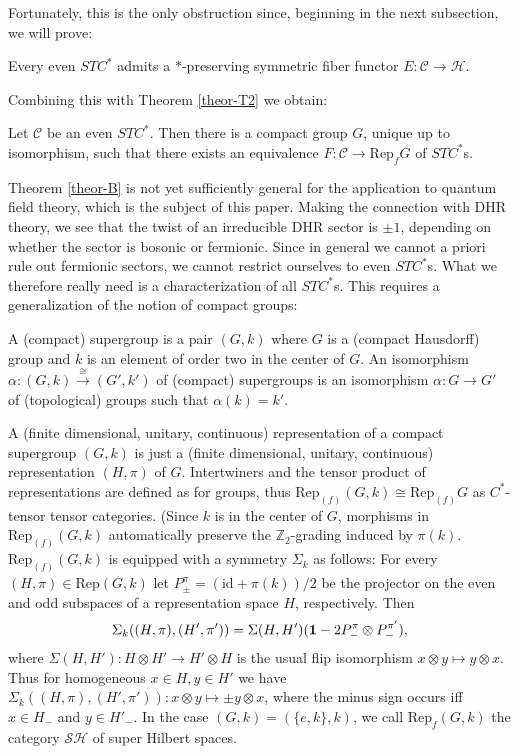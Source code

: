 \documentclass[11pt]{article}
\theoremstyle{definition}
\theoremstyle{definition}
\theoremstyle{remark}
\def\2#1{{\mathcal #1}}
\def\7#1{{\mathbb #1}}
\def\1#1{{\bf #1}}
\newcommand{\Rep}{\mathrm{Rep}}
\newcommand{\rarr}{\rightarrow}
\def\id{\mathrm{id}}
\begin{document}
Fortunately, this is the only obstruction since, beginning in the next subsection, we will prove:

\btheor \label{theor-C} 
Every even $STC^*$ admits a $*$-preserving symmetric fiber functor $E: \2C\rarr\2H$. 
\etheor

Combining this with Theorem \ref{theor-T2} we obtain:

\btheor \label{theor-B}
Let $\2C$ be an even $STC^*$. Then there is a compact group $G$, unique up to isomorphism, such that
there exists an equivalence $F: \2C\rarr\Rep_fG$ of $STC^*$s. 
\etheor

Theorem \ref{theor-B} is not yet sufficiently general for the application to quantum field theory,
which is the subject of this paper. Making the connection with DHR theory, we see that the twist of
an irreducible DHR sector is $\pm 1$, depending on whether the sector is bosonic or fermionic. Since
in general we cannot a priori rule out fermionic sectors, we cannot restrict ourselves to even
$STC^*$s. What we therefore really need is a characterization of all $STC^*$s. This requires a
generalization of the notion of compact groups: 

\bdefin {}
A (compact) supergroup is a pair $(G,k)$ where $G$ is a (compact Hausdorff) group and $k$ is an
element of order two in the center of $G$. An isomorphism
$\alpha:(G,k)\stackrel{\cong}{\rarr}(G',k')$ of (compact) supergroups is an isomorphism $\alpha:G\rarr G'$
of (topological) groups such that $\alpha(k)=k'$.
\edefin

\bdefin {}
A (finite dimensional, unitary, continuous) representation of a compact supergroup $(G,k)$
is just a (finite dimensional, unitary, continuous) representation $(H,\pi)$ of $G$. 
Intertwiners and the tensor product of representations are defined as for groups, thus
$\Rep_{(f)}(G,k)\cong\Rep_{(f)}G$ as $C^*$-tensor tensor categories. (Since $k$ is in the center of
$G$, morphisms in $\Rep_{(f)}(G,k)$ automatically preserve the $\7Z_2$-grading induced by $\pi(k)$.
$\Rep_{(f)}(G,k)$ is equipped with a symmetry $\Sigma_k$ as follows: For every $(H,\pi)\in\Rep(G,k)$
let $P_\pm^\pi=(\id+\pi(k))/2$ be the projector on the even and odd subspaces of a representation
space $H$, respectively. Then 
\[ \Sigma_k((H,\pi),(H',\pi'))= \Sigma(H,H')(\11 - 2 P_-^\pi\otimes P_-^{\pi'}), \]
where $\Sigma(H,H'): H\otimes H'\rarr H'\otimes H$ is the usual flip isomorphism 
$x\otimes y\mapsto y\otimes x$. Thus for homogeneous $x\in H, y\in H'$ we have
$\Sigma_k((H,\pi),(H',\pi')): x\otimes y\mapsto\pm y\otimes x$, where the minus sign occurs iff
$x\in H_-$ and $y\in H'_-$. In the case $(G,k)=(\{e,k\},k)$, we call $\Rep_f(G,k)$ the category
$\2S\2H$ of super Hilbert spaces.
\edefin
\end{document}
